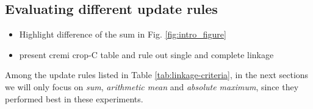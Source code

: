 


\subsection{Evaluating different update rules} \label{sec:exp_first_comparison}
\begin{itemize}
  \item Highlight difference of the sum in Fig. \ref{fig:intro_figure}
  \item present cremi crop-C table and rule out single and complete linkage
\end{itemize}

Among the update rules listed in Table \ref{tab:linkage-criteria}, in the next sections we will only focus on \emph{sum}, \emph{arithmetic mean} and \emph{absolute maximum}, since they performed best in these experiments.


